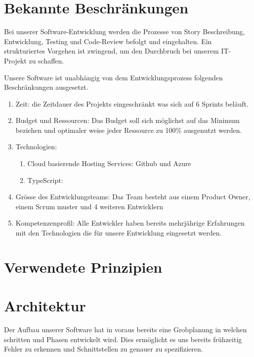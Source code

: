 \documentclass[a4paper, 11pt]{scrartcl}
\let\oldsection\section
\renewcommand\section{\clearpage\oldsection}
\begin{document}
\section{Bekannte Beschränkungen}

Bei unserer Software-Entwicklung werden die Prozesse von Story Beschreibung, Entwicklung, Testing und Code-Review befolgt und eingehalten.
Ein strukturiertes Vorgehen ist zwingend, um den Durchbruch bei unserem IT-Projekt zu schaffen.

Unsere Software ist unabhängig von dem Entwicklungsprozess folgenden Beschränkungen ausgesetzt.
\begin{enumerate}
\item Zeit: die Zeitdauer des Projekts eingeschränkt was sich auf 6 Sprints beläuft.
\item Budget und Ressourcen: Das Budget soll sich möglichst auf das Minimum beziehen und optimaler weise jeder Ressource zu 100\% ausgenutzt werden.
\item Technologien:
	\begin{enumerate}

	\item Cloud basierende Hosting Services: Github und Azure
	\item TypeScript:

	\end{enumerate}
\item Grösse des Entwicklungsteams: Das Team besteht aus einem Product Owner, einem Scrum muster und 4 weiteren Entwicklern
\item Kompetenzenprofil: Alle Entwickler haben bereits mehrjährige Erfahrungen mit den Technologien die für unsere Entwicklung eingesetzt werden.
\end{enumerate}

\section{Verwendete Prinzipien}

\section{Architektur}

Der Aufbau unserer Software hat in voraus bereits eine Grobplanung in welchen schritten und Phasen entwickelt wird.
Dies ermöglicht es uns bereits frühzeitig Fehler zu erkennen und Schnittstellen zu genauer zu spezifizieren.
\end{document}
